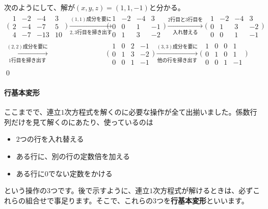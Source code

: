 次のようにして、解が$(x, y, z) = (1, 1, -1)$と分かる。
\begin{align*}
\Biggl(
\begin{array}{rrr|r}
1 & -2 & -4 & 3 \\
2 & -4 & -7 & 5 \\
4 & -7 & -13 & 10
\end{array}
\Biggr) \xrightarrow[\text{$2,3$行目を掃き出す}]{\text{$(1,1)$成分を要に}}
& \Biggl(
\begin{array}{rrr|r}
1 & -2 & -4 & 3 \\
0 & 0 & 1 & -1 \\
0 & 1 & 3 & -2
\end{array}
\Biggr) \xrightarrow[入れ替える]{\text{$2$行目と$3$行目を}}
\Biggl(
\begin{array}{rrr|r}
1 & -2 & -4 & 3 \\
0 & 1 & 3 & -2 \\
0 & 0 & 1 & -1
\end{array}
\Biggr) \\ \xrightarrow[\text{$1$行目を掃き出す}]{\text{$(2,2)成分を要に$}}
& \Biggl(
\begin{array}{rrr|r}
1 & 0 & 2 & -1 \\
0 & 1 & 3 & -2 \\
0 & 0 & 1 & -1
\end{array}
\Biggr) \xrightarrow[\text{他の行を掃き出す}]{\text{$(3,3)$成分を要に}}
\Biggl(
\begin{array}{rrr|r}
1 & 0 & 0 & 1 \\
0 & 1 & 0 & 1 \\
0 & 0 & 1 & -1
\end{array}
\Biggr)
\end{align*}
\qed

\paragraph{行基本変形}
ここまでで、連立$1$次方程式を解くのに必要な操作が全て出揃いました。係数行列だけを見て解くのにあたり、使っているのは
\begin{itemize}
\item $2$つの行を入れ替える
\item ある行に、別の行の定数倍を加える
\item ある行に$0$でない定数をかける
\end{itemize}
という操作の$3$つです。後で示すように、連立$1$次方程式が解けるときは、必ずこれらの組合せで事足ります。そこで、これらの$3$つを\textbf{行基本変形}といいます。

